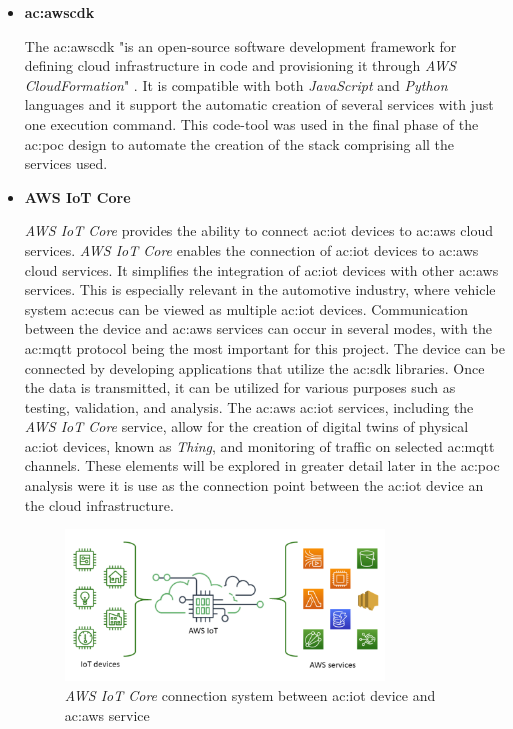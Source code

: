 \begin{itemize}
    \item[] \textbf{\gls{ac:awscdk}} 
    
    The \gls{ac:awscdk} "is an open-source software development framework for defining cloud infrastructure in code and provisioning it through \textit{AWS CloudFormation}" \cite{WhatIsTheAWSCDK}. It is compatible with both \textit{JavaScript} and \textit{Python} languages and it support the automatic creation of several services with just one execution command. This code-tool was used in the final phase of the \gls{ac:poc} design to automate the creation of the stack comprising all the services used.
    
    \item[] \textbf{AWS IoT Core} 
    
    \textit{AWS IoT Core} provides the ability to connect \gls{ac:iot} devices to \gls{ac:aws} cloud services. \textit{AWS IoT Core} enables the connection of \gls{ac:iot} devices to \gls{ac:aws} cloud services. It simplifies the integration of \gls{ac:iot} devices with other \gls{ac:aws} services. This is especially relevant in the automotive industry, where vehicle system \gls{ac:ecu}s can be viewed as multiple \gls{ac:iot} devices. Communication between the device and \gls{ac:aws} services can occur in several modes, with the \gls{ac:mqtt} protocol being the most important for this project. The device can be connected by developing applications that utilize the \gls{ac:sdk} libraries. Once the data is transmitted, it can be utilized for various purposes such as testing, validation, and analysis. The \gls{ac:aws} \gls{ac:iot} services, including the \textit{AWS IoT Core} service, allow for the creation of digital twins of physical \gls{ac:iot} devices, known as \textit{Thing}, and monitoring of traffic on selected \gls{ac:mqtt} channels. These elements will be explored in greater detail later in the \gls{ac:poc} analysis were it is use as the connection point between the \gls{ac:iot} device an the cloud infrastructure.
    \begin{figure}[h]  %
        \centering
        \includegraphics[width=0.8\textwidth]{images/AWSIoTCore.png}  %
        \caption{\textit{AWS IoT Core} connection system between \gls{ac:iot} device and \gls{ac:aws} service \cite{AWSIoTCore}}
        \label{fig:AWSIoTCore}
    \end{figure}


\end{itemize}
